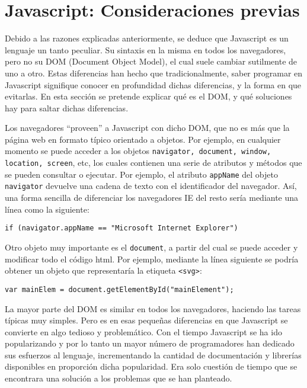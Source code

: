 \section{Javascript: Consideraciones previas}
Debido a las razones explicadas anteriormente, se deduce que Javascript es un lenguaje un tanto peculiar. Su sintaxis en la misma en todos los navegadores, pero no su DOM (Document Object Model), el cual suele cambiar sutilmente de uno a otro. Estas diferencias han hecho que tradicionalmente, saber programar en Javascript signifique conocer en profundidad dichas diferencias, y la forma en que evitarlas. En esta sección se pretende explicar qué es el DOM, y qué soluciones hay para saltar dichas diferencias.

Los navegadores ``proveen'' a Javascript con dicho DOM, que no es más que la página web en formato típico orientado a objetos. Por ejemplo, en cualquier momento se puede acceder a los objetos \texttt{navigator, document, window, location, screen}, etc, los cuales contienen una serie de atributos y métodos que se pueden consultar o ejecutar. Por ejemplo, el atributo \texttt{appName} del objeto \texttt{navigator} devuelve una cadena de texto con el identificador del navegador. Así, una forma sencilla de diferenciar los navegadores IE del resto sería mediante una línea como la siguiente:

\begin{verbatim}
if (navigator.appName == "Microsoft Internet Explorer") 
\end{verbatim}

Otro objeto muy importante es el \texttt{document}, a partir del cual se puede acceder y modificar todo el código html. Por ejemplo, mediante la línea siguiente se podría obtener un objeto que representaría la etiqueta \texttt{<svg>}:

\begin{verbatim}
var mainElem = document.getElementById("mainElement");
\end{verbatim}

La mayor parte del DOM es similar en todos los navegadores, haciendo las tareas típicas muy simples. Pero es en esas pequeñas diferencias en que Javascript se convierte en algo tedioso y problemático. Con el tiempo Javascript se ha ido popularizando y por lo tanto un mayor número de programadores han dedicado sus esfuerzos al lenguaje, incrementando la cantidad de documentación y librerías disponibles en proporción dicha popularidad. Era solo cuestión de tiempo que se encontrara una solución a los problemas que se han planteado.

